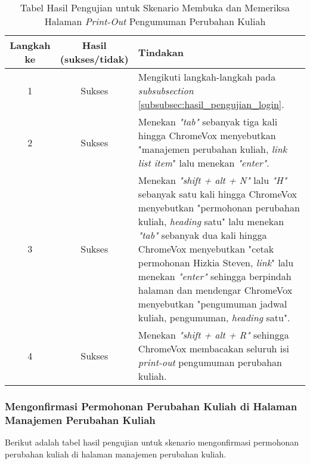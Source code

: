 \begin{table}[H]
    \centering 
    \caption{Tabel Hasil Pengujian untuk Skenario Membuka dan Memeriksa Halaman \textit{Print-Out} Pengumuman Perubahan Kuliah}
    \label{tab:hasil_pengujian_membuka_dan_memeriksa_halaman_print_out_pengumuman_perubahan_kuliah}
    \begin{tabular}{|c|c|p{10cm}|}
        \toprule
        Langkah ke & Hasil (sukses/tidak) & Tindakan \\

        \midrule
        1 & Sukses & Mengikuti langkah-langkah pada \textit{subsubsection} \ref{subsubsec:hasil_pengujian_login}. \\
        2 & Sukses & Menekan \textit{"tab"} sebanyak tiga kali hingga ChromeVox menyebutkan "manajemen perubahan kuliah, \textit{link list item}" lalu menekan \textit{"enter"}. \\
        3 & Sukses & Menekan \textit{"shift + alt + N"} lalu \textit{"H"} sebanyak satu kali hingga ChromeVox menyebutkan "permohonan perubahan kuliah, \textit{heading} satu" lalu menekan \textit{"tab"} sebanyak dua kali hingga ChromeVox menyebutkan "cetak permohonan Hizkia Steven, \textit{link}" lalu menekan \textit{"enter"} sehingga berpindah halaman dan mendengar ChromeVox menyebutkan "pengumuman jadwal kuliah, pengumuman, \textit{heading} satu". \\
        4 & Sukses & Menekan \textit{"shift + alt + R"} sehingga ChromeVox membacakan seluruh isi \textit{print-out} pengumuman perubahan kuliah. \\ 

        \bottomrule

    \end{tabular}
\end{table}

\subsubsection{Mengonfirmasi Permohonan Perubahan Kuliah di Halaman Manajemen Perubahan Kuliah}
\label{subsubsec:hasil_pengujian_mengonfirmasi_permohonan_perubahan_kuliah_di_halaman_manajemen_perubahan_kuliah}
Berikut adalah tabel hasil pengujian untuk skenario mengonfirmasi permohonan perubahan kuliah di halaman manajemen perubahan kuliah.

